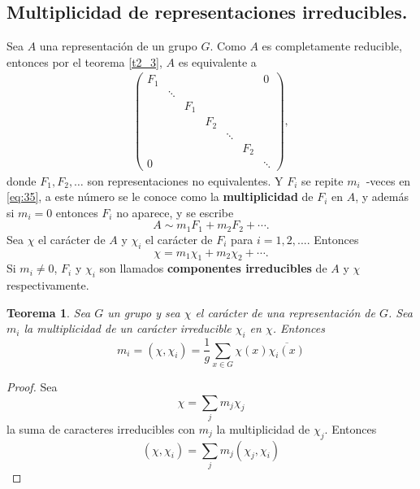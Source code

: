 \documentclass[12pt]{book}
\newtheorem{theorem}{Teorema}[section]
\theoremstyle{definition}
\newcounter{in}
\begin{document}
\subsection{Multiplicidad de representaciones irreducibles.}
\label{subsec:mri}
 Sea $A$ una representación de un grupo $G$. Como $A$ es completamente
reducible, entonces por el teorema \ref{t2_3}, $A$ es equivalente a
\begin{equation}
  \label{eq:35}
  \begin{aligned}
    \begin{pmatrix}
      F_{1} & & & & & & 0\\ 
      & \ddots & & & & & \\
      & & F_{1} & & & & \\
      & & & F_{2} & & & \\
      & & & & \ddots & & \\
      & & & & & F_{2} & \\
      0 & & & & & & \ddots
    \end{pmatrix},
  \end{aligned}
\end{equation}
donde $F_{1}, F_{2}, \ldots$ son representaciones no equivalentes. Y
$F_{i}$ se repite $m_{i}$~-veces en \ref{eq:35}, a este número se le
conoce como la \textbf{multiplicidad} de $F_{i}$ en $A$, y además si $m_{i}=0$
entonces $F_{i}$ no aparece, y se escribe
\begin{equation}
  \label{eq:36}
  A \sim m_{1} F_{1}+ m_{2} F_{2}+ \cdots .
\end{equation}
Sea $\chi$ el carácter de $A$ y $\chi_{i}$ el carácter de $F_{i}$
para $i = 1, 2, ...$. Entonces
\begin{equation}
  \label{eq:37}
  \chi =m_{1} \chi_{1}+ m_{2} \chi_{2}+ \cdots .
\end{equation}
Si $m_{i} \neq 0$, $F_{i}$ y $\chi_{i}$ son llamados \textbf{componentes
irreducibles} de $A$ y $\chi$ respectivamente.

\begin{theorem}
  \label{t4_5}
  Sea $G$ un grupo y sea $\chi$ el carácter de una
  representación de $G$. Sea $m_{i}$ la multiplicidad de un carácter
  irreducible $\chi_{i}$ en $\chi$. Entonces
  \begin{equation*}
    m_{i} = (\chi,\chi_{i}) = \frac{1}{g} \sum_{x \in G} \chi(x) \overline{\chi_{i}(x)}
  \end{equation*}

\end{theorem}
\begin{proof}
  Sea $$\chi=\sum_{j} m_{j} \chi_{j}$$ la suma de caracteres
  irreducibles con $m_{j}$ la multiplicidad de $\chi_{j}$. Entonces
  \begin{equation}
    \label{eq:38}
    (\chi,\chi_{i}) = \sum_{j} m_{j} (\chi_{j},\chi_{i})
  \end{equation}
\end{proof}
\end{document}
